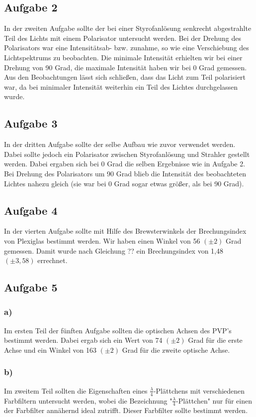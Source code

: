 \documentclass[12pt]{scrartcl}
\begin{document}
\subsection{Aufgabe 2}
In der zweiten Aufgabe sollte der bei einer Styrofanlösung senkrecht abgestrahlte Teil des Lichts mit einem Polarisator untersucht werden. Bei der Drehung des Polarisators war eine Intensitätsab- bzw. zunahme, so wie eine Verschiebung des Lichtspektrums zu beobachten. Die minimale Intensität erhielten wir bei einer Drehung von 90 Grad, die maximale Intensität haben wir bei 0 Grad gemessen. Aus den Beobachtungen lässt sich schließen, dass das Licht zum Teil polarisiert war, da bei minimaler Intensität weiterhin ein Teil des Lichtes durchgelassen wurde.

\subsection{Aufgabe 3}
In der dritten Aufgabe sollte der selbe Aufbau wie zuvor verwendet werden. Dabei sollte jedoch ein Polarisator zwischen Styrofanlösung und Strahler gestellt werden. Dabei ergaben sich bei 0 Grad die selben Ergebnisse wie in Aufgabe 2. Bei Drehung des Polarisators um 90 Grad blieb die Intensität des beobachteten Lichtes nahezu gleich (sie war bei 0 Grad sogar etwas größer, als bei 90 Grad).


\subsection{Aufgabe 4}
In der vierten Aufgabe sollte mit Hilfe des Brewsterwinkels der Brechungsindex von Plexiglas bestimmt werden. Wir haben einen Winkel von 56 $(\pm 2)$ Grad gemessen. Damit wurde nach Gleichung ?? ein Brechungsindex  von 1,48 $(\pm3,58)$ errechnet.

\subsection{Aufgabe 5}

\subsubsection{a)}
Im ersten Teil der fünften Aufgabe sollten die optischen Achsen des PVP's bestimmt werden.
Dabei ergab sich ein Wert von 74 $(\pm 2)$ Grad für die erste Achse und ein Winkel von 163 $(\pm 2)$ Grad für die zweite optische Achse.

\subsubsection{b)}
Im zweitem Teil sollten die Eigenschaften eines $\frac{\lambda}{4}$-Plättchens mit verschiedenen Farbfiltern untersucht werden, wobei die Bezeichnung "$\frac{\lambda}{4}$-Plättchen" nur für einen der Farbfilter annähernd ideal zutrifft. Dieser Farbfilter sollte bestimmt werden.
\end{document}
